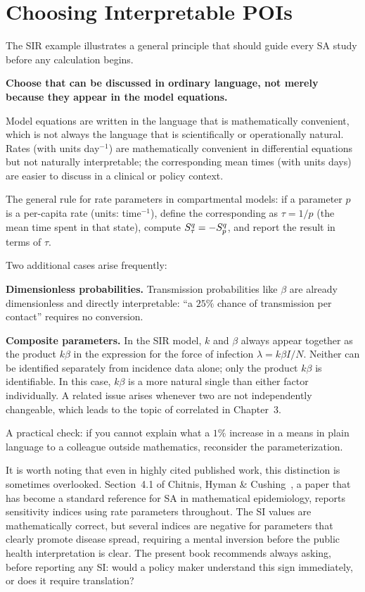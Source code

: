 \section{Choosing Interpretable POIs}
\label{sec:interpretablePOIs}

The SIR example illustrates a general principle that should guide
every SA study before any calculation begins.

\textbf{Choose \POIs that can be discussed in ordinary language,
not merely because they appear in the model equations.}

Model equations are written in the language that is mathematically
convenient, which is not always the language that is scientifically
or operationally natural. Rates (with units day$^{-1}$) are
mathematically convenient in differential equations but not naturally
interpretable; the corresponding mean times (with units days)
are easier to discuss in a clinical or policy context.

The general rule for rate parameters in compartmental models:
if a parameter $p$ is a per-capita rate (units: time$^{-1}$),
define the corresponding \POI as $\tau = 1/p$ (the mean time
spent in that state), compute $S_{\tau}^{q} = -S_{p}^{q}$,
and report the result in terms of $\tau$.

Two additional cases arise frequently:

\textbf{Dimensionless probabilities.}
Transmission probabilities like $\beta$ are already dimensionless
and directly interpretable: ``a $25\%$ chance of transmission
per contact'' requires no conversion.

\textbf{Composite parameters.}
In the SIR model, $k$ and $\beta$ always appear together as the
product $k\beta$ in the expression for the force of infection
$\lambda = k\beta I/N$. Neither can be identified separately from
incidence data alone; only the product $k\beta$ is identifiable.
In this case, $k\beta$ is a more natural single \POI than either
factor individually. A related issue arises whenever two \POIs
are not independently changeable, which leads to the topic of
correlated \POIs in Chapter~3.

A practical check: if you cannot explain what a $1\%$ increase in a
\POI means in plain language to a colleague outside mathematics,
reconsider the parameterization.

It is worth noting that even in highly cited published work, this
distinction is sometimes overlooked.
Section~4.1 of Chitnis, Hyman \& Cushing~\cite{chitnis2008determining},
a paper that has become a standard reference for SA in mathematical
epidemiology, reports sensitivity indices using rate parameters
throughout. The SI values are mathematically correct, but several
indices are negative for parameters that clearly promote disease spread,
requiring a mental inversion before the public health interpretation
is clear. The present book recommends always asking, before reporting
any SI: would a policy maker understand this sign immediately,
or does it require translation?

